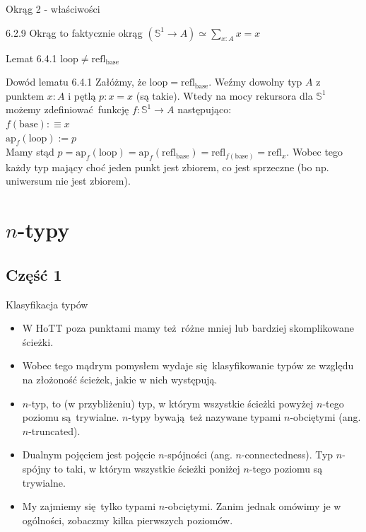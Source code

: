 \documentclass{beamer}
\newcommand{\defn}{:\equiv}
\newcommand{\refl}[1]{\text{refl}_{#1}}
\newcommand{\ap}[2]{\text{ap}_{#1}(#2)}
\newcommand{\hS}{\mathbb{S}^1}
\newcommand{\base}{\text{base}}
\newcommand{\looop}{\text{loop}}
\begin{document}
\begin{frame}{Okrąg 2 - właściwości}
	
\begin{block}{6.2.9 Okrąg to faktycznie okrąg}
$(\hS \to A) \simeq \sum_{x : A} x = x$
\end{block}

\begin{block}{Lemat 6.4.1}
$\looop \neq \refl{\base}$
\end{block}

\begin{block}{Dowód lematu 6.4.1}
Załóżmy, że $\looop = \refl{\base}$. Weźmy dowolny typ $A$ z punktem $x : A$ i pętlą $p : x = x$ (są takie). Wtedy na mocy rekursora dla $\hS$ możemy zdefiniować funkcję $f : \hS \to A$ następująco: \\

$f(\base) \defn x$ \\
$\ap{f}{\looop} := p$ \\

Mamy stąd $p = \ap{f}{\looop} = \ap{f}{\refl{\base}} = \refl{f(\base)} = \refl{x}$. Wobec tego każdy typ mający choć jeden punkt jest zbiorem, co jest sprzeczne (bo np. uniwersum nie jest zbiorem).
\end{block}

\end{frame}

\section{$n$-typy}

\subsection{Część 1}

\begin{frame}{Klasyfikacja typów}
\begin{itemize}
	\item W HoTT poza punktami mamy też różne mniej lub bardziej skomplikowane ścieżki.
	\item Wobec tego mądrym pomysłem wydaje się klasyfikowanie typów ze względu na złożoność ścieżek, jakie w nich występują.
	\item $n$-typ, to (w przybliżeniu) typ, w którym wszystkie ścieżki powyżej $n$-tego poziomu są trywialne. $n$-typy bywają też nazywane typami $n$-obciętymi (ang. $n$-truncated).
	\item Dualnym pojęciem jest pojęcie $n$-spójności (ang. $n$-connectedness). Typ $n$-spójny to taki, w którym wszystkie ścieżki poniżej $n$-tego poziomu są trywialne.
	\item My zajmiemy się tylko typami $n$-obciętymi. Zanim jednak omówimy je w ogólności, zobaczmy kilka pierwszych poziomów.
\end{itemize}
\end{frame}
\end{document}

